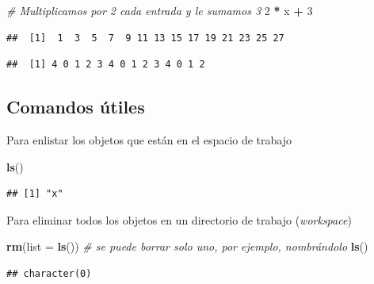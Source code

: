 \documentclass[]{article}
\newenvironment{Shaded}{\begin{snugshade}}{\end{snugshade}}
\newcommand{\KeywordTok}[1]{\textcolor[rgb]{0.13,0.29,0.53}{\textbf{#1}}}
\newcommand{\DataTypeTok}[1]{\textcolor[rgb]{0.13,0.29,0.53}{#1}}
\newcommand{\DecValTok}[1]{\textcolor[rgb]{0.00,0.00,0.81}{#1}}
\newcommand{\StringTok}[1]{\textcolor[rgb]{0.31,0.60,0.02}{#1}}
\newcommand{\CommentTok}[1]{\textcolor[rgb]{0.56,0.35,0.01}{\textit{#1}}}
\newcommand{\OperatorTok}[1]{\textcolor[rgb]{0.81,0.36,0.00}{\textbf{#1}}}
\newcommand{\NormalTok}[1]{#1}
\begin{document}
\begin{Shaded}
\begin{Highlighting}[]
\CommentTok{# Multiplicamos por 2 cada entrada y le sumamos 3}
\DecValTok{2} \OperatorTok{*}\StringTok{ }\NormalTok{x }\OperatorTok{+}\StringTok{ }\DecValTok{3}
\end{Highlighting}
\end{Shaded}

\begin{verbatim}
##  [1]  1  3  5  7  9 11 13 15 17 19 21 23 25 27
\end{verbatim}

\begin{Shaded}
\end{Shaded}

\begin{verbatim}
##  [1] 4 0 1 2 3 4 0 1 2 3 4 0 1 2
\end{verbatim}

\subsection{Comandos útiles}\label{comandos-utiles}

Para enlistar los objetos que están en el espacio de trabajo

\begin{Shaded}
\begin{Highlighting}[]
\KeywordTok{ls}\NormalTok{()}
\end{Highlighting}
\end{Shaded}

\begin{verbatim}
## [1] "x"
\end{verbatim}

Para eliminar todos los objetos en un directorio de trabajo
(\emph{workspace})

\begin{Shaded}
\begin{Highlighting}[]
\KeywordTok{rm}\NormalTok{(}\DataTypeTok{list =} \KeywordTok{ls}\NormalTok{()) }\CommentTok{# se puede borrar solo uno, por ejemplo, nombrándolo}
\KeywordTok{ls}\NormalTok{()}
\end{Highlighting}
\end{Shaded}

\begin{verbatim}
## character(0)
\end{verbatim}
\end{document}
